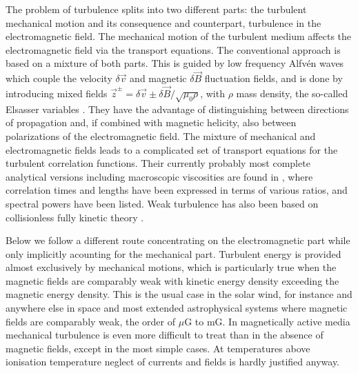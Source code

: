 \documentclass[ ]{copernicus2}
\begin{document}
{The problem of turbulence splits into two different parts: the turbulent mechanical motion and its consequence and counterpart,  turbulence in the electromagnetic field. The mechanical motion of the turbulent medium affects the electromagnetic field via the transport equations. The conventional approach \citep[for a most recent theoretical treatment including transport see][]{zank2012} is based on a mixture of both parts. {This is guided by low frequency Alfv\'en waves which couple the velocity $\delta\vec{v}$ and magnetic $\delta\vec{B}$ fluctuation fields, and is done by introducing mixed fields $\vec{z}^\pm=\delta\vec{v}\pm\delta\vec{B}/\sqrt{\mu_0\rho}$, with $\rho$ mass density, the so-called Elsasser variables \citep[defined two thirds of a century ago by W.][]{elsasser1950}. They have the advantage of distinguishing between directions of propagation and, if combined with magnetic helicity, also between polarizations of the electromagnetic field. The mixture of mechanical and electromagnetic fields leads to a complicated set of transport equations for the turbulent correlation functions. Their currently probably most complete analytical versions including macroscopic viscosities are found in \citet{zank2012}, where correlation times and lengths have been expressed in terms of various ratios, and spectral powers have been listed. Weak turbulence has also been based on collisionless fully kinetic theory \citep[cf.,][]{yoon2007a,yoon2007b}. } 

Below we follow a different route concentrating on the electromagnetic part while only implicitly acounting for the mechanical part.  Turbulent energy is provided almost exclusively by mechanical motions, which is particularly true when the magnetic fields are comparably weak with kinetic energy density exceeding the magnetic energy density. This is the usual case in the solar wind, for instance and anywhere else in space and most extended astrophysical systems where magnetic fields are comparably weak, the order of $\mu$G to mG. In magnetically active media mechanical turbulence is even more difficult to treat than in the absence of magnetic fields, except in the most simple cases. At temperatures above ionisation temperature neglect of currents and fields is hardly justified anyway. 

}
\end{document}
